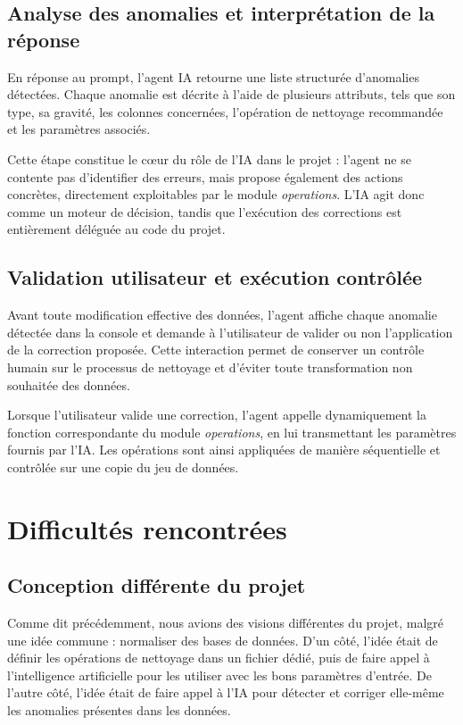 \documentclass[a4paper, 12pt, twoside]{article}
\begin{document}
\subsection{Analyse des anomalies et interprétation de la réponse}

En réponse au prompt, l’agent IA retourne une liste structurée d’anomalies détectées. Chaque anomalie est décrite à l’aide de plusieurs attributs, tels que son type, sa gravité, les colonnes concernées, l’opération de nettoyage recommandée et les paramètres associés.

Cette étape constitue le cœur du rôle de l’IA dans le projet : l’agent ne se contente pas d’identifier des erreurs, mais propose également des actions concrètes, directement exploitables par le module \textit{operations}. L’IA agit donc comme un moteur de décision, tandis que l’exécution des corrections est entièrement déléguée au code du projet.

\subsection{Validation utilisateur et exécution contrôlée}

Avant toute modification effective des données, l’agent affiche chaque anomalie détectée dans la console et demande à l’utilisateur de valider ou non l’application de la correction proposée. Cette interaction permet de conserver un contrôle humain sur le processus de nettoyage et d’éviter toute transformation non souhaitée des données.

Lorsque l’utilisateur valide une correction, l’agent appelle dynamiquement la fonction correspondante du module \textit{operations}, en lui transmettant les paramètres fournis par l’IA. Les opérations sont ainsi appliquées de manière séquentielle et contrôlée sur une copie du jeu de données.

\newpage
\section{Difficultés rencontrées}
    \subsection{Conception différente du projet}
Comme dit précédemment, nous avions des visions différentes du projet, malgré une idée commune : normaliser des bases de données.  
D’un côté, l’idée était de définir les opérations de nettoyage dans un fichier dédié, puis de faire appel à l’intelligence artificielle pour les utiliser avec les bons paramètres d’entrée.  
De l’autre côté, l’idée était de faire appel à l’IA pour détecter et corriger elle-même les anomalies présentes dans les données.
\end{document}
